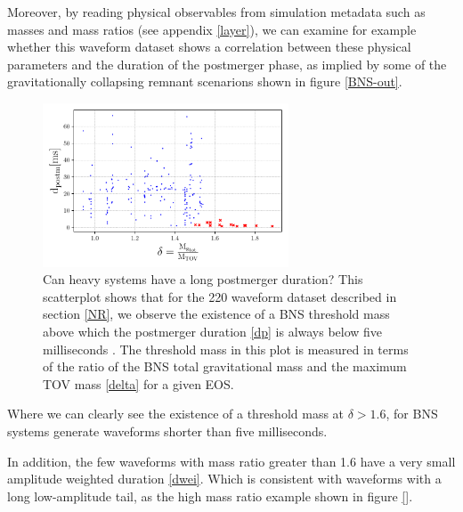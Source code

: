 \FloatBarrier 


Moreover, by reading physical observables from simulation metadata such as masses and mass ratios (see appendix \ref{layer}), we can examine for example whether this waveform dataset shows a correlation between these physical parameters and the duration of the postmerger phase, as implied by some of the gravitationally collapsing remnant scenarions shown in figure \ref{BNS-out}. 

\begin{figure}[hbt!]
\begin{center}
\includegraphics[width=0.65\textwidth, angle=0]{images/Data_analysis/results/res0.pdf}
\captionsetup{width=0.8\textwidth}
\caption[Can heavy systems have a long postmerger duration?]{Can heavy systems have a long postmerger duration? This scatterplot shows that for the 220 waveform dataset described in section \ref{NR}, we observe the existence of a BNS threshold mass above which the postmerger duration \ref{dp} is always below five milliseconds \cite{Kashyap_2022}. The threshold mass in this plot is measured in terms of the ratio of the BNS total gravitational mass and the maximum TOV mass \ref{delta} for a given EOS.}
\label{heavy systems}
\end{center}
\end{figure}
\FloatBarrier

Where we can clearly see the existence of a threshold mass at $\delta> 1.6$, for BNS systems generate waveforms shorter than five milliseconds.

In addition, the few waveforms with mass ratio greater than 1.6 have a very small amplitude weighted duration \ref{dwei}. Which is consistent with waveforms with a long low-amplitude tail, as the high mass ratio example shown in figure \ref{}.



